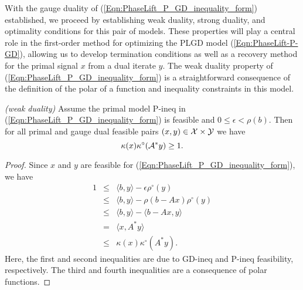 With the gauge duality of (\ref{Eqn:PhaseLift_P_GD_inequality_form}) established, we proceed by establishing weak duality, strong duality, and optimality conditions for this pair of models.  These properties will play a central role in the first-order method for optimizing the PLGD model (\ref{Eqn:PhaseLift-P-GD}), allowing us to develop termination conditions as well as a recovery method for the primal signal $x$ from a dual iterate $y$.  The weak duality property of (\ref{Eqn:PhaseLift_P_GD_inequality_form}) is a straightforward consequence of the definition of the polar of a function and inequality constraints in this model.

\begin{prop} \label{Prop:weak_duality}
\emph{(weak duality)}
Assume the primal model P-ineq in (\ref{Eqn:PhaseLift_P_GD_inequality_form}) is feasible and $0 \leq \epsilon < \rho(b)$.  Then for all primal and gauge dual feasible pairs $(x, y) \in {\mathcal X} \times {\mathcal Y}$ we have
\begin{equation}				\label{Eqn:weak_duality}
\kappa(x) \kappa^\circ ( {\mathcal A}^* y ) \geq 1.
\end{equation}

\end{prop}
\begin{proof}
Since $x$ and $y$ are feasible for (\ref{Eqn:PhaseLift_P_GD_inequality_form}), we have
\begin{equation} 		\label{Eqn:weak_duality_inequalities}
\begin{array}{rcl}
1 
	&	\leq 	&	\langle b, y \rangle - \epsilon \rho^\circ(y)	\\
	&	\leq 	&	\langle b, y \rangle - \rho(b - Ax) \rho^\circ(y) \\
	&	\leq 	&	\langle b, y \rangle - \langle b - Ax, y \rangle \\
	&	=		&	\langle x, A^*y \rangle \\	
	&	\leq 	&	\kappa(x) \kappa^\circ(A^*y).
\end{array}
\end{equation}
Here, the first and second inequalities are due to GD-ineq and P-ineq feasibility, respectively.  The third and fourth inequalities are a consequence of polar functions.
\end{proof}




